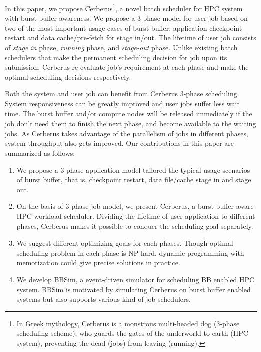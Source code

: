 In this paper, we propose Cerberus\footnote{In Greek mythology,
Cerberus is a monstrous multi-headed dog (3-phase scheduling scheme),
who guards the gates of the underworld to earth (HPC system),
preventing the dead (jobs) from leaving (running).},
a novel batch scheduler for HPC system with burst buffer awareness. 
We propose a 3-phase model for user job 
based on two of the most important usage cases of burst buffer: 
application checkpoint restart and data cache/pre-fetch for stage in/out. 
The lifetime of user job consists of \textit{stage in} phase, 
\textit{running} phase, and \textit{stage-out} phase. 
Unlike existing batch schedulers that 
make the permanent scheduling decision for job upon its submission, 
Cerberus re-evaluate job's requirement at each phase 
and make the optimal scheduling decisions respectively.

Both the system and user job can benefit from Cerberus 3-phase scheduling.
System responsiveness can be greatly improved and
user jobs suffer less wait time. 
The burst buffer and/or compute nodes will be released immediately
if the job don't need them to finish the next phase,
and become available to the waiting jobs.
As Cerberus takes advantage of the parallelism of jobs in different phases,
system throughput also gets improved.
Our contributions in this paper are summarized as follows:
\begin{enumerate}
        \item %
                We propose a 3-phase application model tailored the typical
                usage scenarios of burst buffer, that is, checkpoint restart,
                data file/cache stage in and stage out.
        \item On the basis of 3-phase job model, we present Cerberus,
                a burst buffer aware HPC workload scheduler.
                Dividing the lifetime of user application to different phases,
                Cerberus makes it possible to conquer the scheduling goal separately.
        \item We suggest different optimizing goals for each phases.
                Though optimal scheduling problem in each phase is NP-hard,
                dynamic programming with memorization could give precise solutions
                in practice.
        \item We develop BBSim, a event-driven simulator for scheduling
                BB enabled HPC system.
                BBSim is motivated by simulating Cerberus
                on burst buffer enabled systems but also supports various kind of job schedulers.
\end{enumerate}

